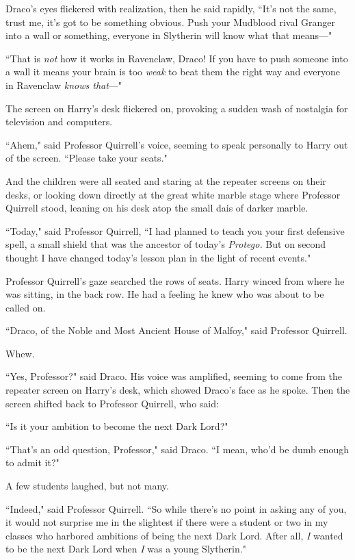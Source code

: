 Draco's eyes flickered with realization, then he said rapidly, ``It's not the same, trust me, it's got to be something obvious. Push your Mudblood rival Granger into a wall or something, everyone in Slytherin will know what that means—"

``That is \emph{not} how it works in Ravenclaw, Draco! If you have to push someone into a wall it means your brain is too \emph{weak} to beat them the right way and everyone in Ravenclaw \emph{knows that}—"

The screen on Harry's desk flickered on, provoking a sudden wash of nostalgia for television and computers.

``Ahem," said Professor Quirrell's voice, seeming to speak personally to Harry out of the screen. ``Please take your seats."

\later

And the children were all seated and staring at the repeater screens on their desks, or looking down directly at the great white marble stage where Professor Quirrell stood, leaning on his desk atop the small dais of darker marble.

``Today," said Professor Quirrell, ``I had planned to teach you your first defensive spell, a small shield that was the ancestor of today's \emph{Protego.} But on second thought I have changed today's lesson plan in the light of recent events."

Professor Quirrell's gaze searched the rows of seats. Harry winced from where he was sitting, in the back row. He had a feeling he knew who was about to be called on.

``Draco, of the Noble and Most Ancient House of Malfoy," said Professor Quirrell.

Whew.

``Yes, Professor?" said Draco. His voice was amplified, seeming to come from the repeater screen on Harry's desk, which showed Draco's face as he spoke. Then the screen shifted back to Professor Quirrell, who said:

``Is it your ambition to become the next Dark Lord?"

``That's an odd question, Professor," said Draco. ``I mean, who'd be dumb enough to admit it?"

A few students laughed, but not many.

``Indeed," said Professor Quirrell. ``So while there's no point in asking any of you, it would not surprise me in the slightest if there were a student or two in my classes who harbored ambitions of being the next Dark Lord. After all, \emph{I} wanted to be the next Dark Lord when \emph{I} was a young Slytherin."

